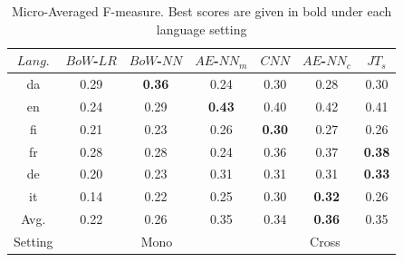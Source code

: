 \documentclass[11pt,a4paper]{article}
\begin{document}
 \begin{table}[!htp]
  \centering
  \begin{tabular}{ c | c c c | c c c}
  \toprule
    $Lang.$ & $BoW$-$LR$ & $BoW$-$NN$ & $AE$-$NN_{m}$ & $CNN$ & $AE$-$NN_{c}$ & $JT_{s}$\\
    \midrule
    da  & 	0.29 & \textbf{0.36} & 0.24 & 0.30 & 0.28 & 0.30\\
    en   &  0.24 & 0.29 & \textbf{0.43} & 0.40 & 0.42 & 0.41\\    	
    fi  &   0.21 & 0.23 & 0.26 & \textbf{0.30} & 0.27 & 0.26\\
    fr    & 0.28 & 0.28 & 0.24 & 0.36 & 0.37 & \textbf{0.38} \\
    de    &  0.20 & 0.23 & 0.31 & 0.31 & 0.31 & \textbf{0.33}\\
    it    & 0.14 & 0.22 & 0.25 & 0.30 & \textbf{0.32} & 0.26\\
\midrule
Avg.    & 0.22 & 0.26 & 0.35 & 0.34 & \textbf{0.36} & 0.35\\
\midrule
Setting &  \multicolumn{3}{c|}{Mono} & \multicolumn{3}{c}{Cross} \\
 \bottomrule

  \end{tabular}
  \caption{Micro-Averaged F-measure. Best scores are given in bold under each language setting}
  \label{tab:al}
\end{table}


\end{document}
